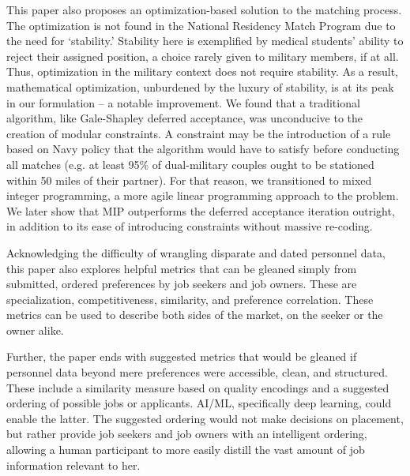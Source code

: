 This paper also proposes an optimization-based solution to the matching process. The optimization is not found in the National Residency Match Program due to the need for ‘stability.’ Stability here is exemplified by medical students’ ability to reject their assigned position, a choice rarely given to military members, if at all. Thus, optimization in the military context does not require stability.  As a result, mathematical optimization, unburdened \cite{1984_Roth} \cite{1985_Roth_b} \cite{1989_Roth} by the luxury of stability, is at its peak in our formulation -- a notable improvement. 
We found that a traditional algorithm, like Gale-Shapley deferred acceptance, was unconducive to the creation of modular constraints.  A constraint may be the introduction of a rule based on Navy policy that the algorithm would have to satisfy before conducting all matches (e.g. at least 95\% of  dual-military couples ought to be stationed within 50 miles of their partner). For that reason, we transitioned to mixed integer programming, a more agile linear programming approach to the problem.  We later show that MIP outperforms the deferred acceptance iteration outright, in addition to its ease of introducing constraints without massive re-coding. 

Acknowledging the difficulty of wrangling disparate and dated personnel data, this paper also explores helpful metrics that can be gleaned simply from submitted, ordered preferences by job seekers and job owners. These are specialization, competitiveness, similarity, and preference correlation. These metrics can be used to describe both sides of the market, on the seeker or the owner alike. 
 
Further, the paper ends with suggested metrics that would be gleaned if personnel data beyond mere preferences were accessible, clean, and structured. These include a similarity measure based on quality encodings and a suggested ordering of possible jobs or applicants. AI/ML, specifically deep learning, could enable the latter. The suggested ordering would not make decisions on placement, but rather provide job seekers and job owners with an intelligent ordering, allowing a human participant to more easily distill the vast amount of job information relevant to her. 

